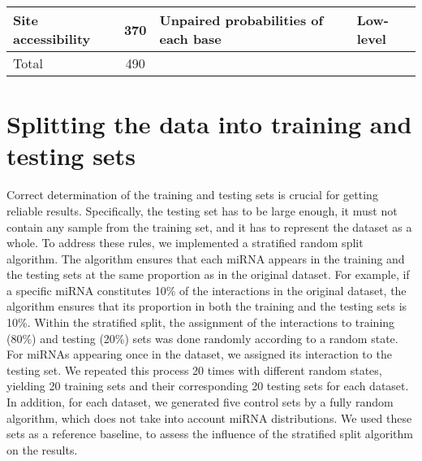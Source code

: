 \begin{table}[h!]
{\begin{tabular}{|l|c|ll}
Site accessibility & 370                                       & \multicolumn{1}{l|}{Unpaired probabilities of each base}                                                                                                 & \multicolumn{1}{l|}{Low-level}  \\ \hline
Total              & 490                                       &                                                                                                                                         &                                                  \\ \cline{1-2}
\end{tabular}}
\end{table}


\section{Splitting the data into training and testing sets} \label{method:split}
Correct determination of the training and testing sets is crucial for getting reliable results. Specifically, the testing set has to be large enough, it must not contain any sample from the training set, and it has to represent the dataset as a whole. 
To address these rules, we implemented a stratified random split algorithm. The algorithm ensures that each miRNA appears in the training and the testing sets at the same proportion as in the original dataset. For example, if a specific miRNA constitutes 10\% of the interactions in the original dataset, the algorithm ensures that its proportion in both the training and the testing sets is 10\%. Within the stratified split, the assignment of the interactions to training (80\%) and testing (20\%) sets was done randomly according to a random state. For miRNAs appearing once in the dataset, we assigned its interaction to the testing set.
We repeated this process 20 times with different random states, yielding 20 training sets and their corresponding 20 testing sets for each dataset. 
In addition, for each dataset, we generated five control sets by a fully random algorithm, which does not take into account miRNA distributions. We used these sets as a reference baseline, to assess the influence of the stratified split algorithm on the results.

